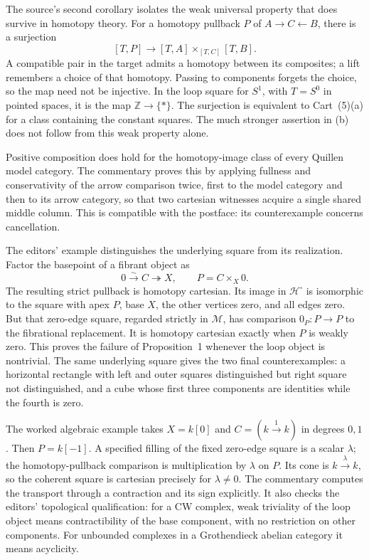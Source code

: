 The source's second corollary isolates the weak universal property that does survive in homotopy theory. For a homotopy pullback $P$ of $A\to C\leftarrow B$, there is a surjection
\[
[T,P]\longrightarrow[T,A]\times_{[T,C]}[T,B].
\]
A compatible pair in the target admits a homotopy between its composites; a lift remembers a choice of that homotopy. Passing to components forgets the choice, so the map need not be injective. In the loop square for $S^1$, with $T=S^0$ in pointed spaces, it is the map $\mathbb Z\to\{*\}$. The surjection is equivalent to Cart~(5)(a) for a class containing the constant squares. The much stronger assertion in (b) does not follow from this weak property alone.

Positive composition does hold for the homotopy-image class of every Quillen model category. The commentary proves this by applying fullness and conservativity of the arrow comparison twice, first to the model category and then to its arrow category, so that two cartesian witnesses acquire a single shared middle column. This is compatible with the postface: its counterexample concerns cancellation.

The editors' example distinguishes the underlying square from its realization. Factor the basepoint of a fibrant object as
\[
0\xrightarrow{\sim}C\twoheadrightarrow X,
\qquad P=C\times_X0.
\]
The resulting strict pullback is homotopy cartesian. Its image in $\mathcal H^{\square}$ is isomorphic to the square with apex $P$, base $X$, the other vertices zero, and all edges zero. But that zero-edge square, regarded strictly in $\mathcal M$, has comparison $0_P:P\to P$ to the fibrational replacement. It is homotopy cartesian exactly when $P$ is weakly zero. This proves the failure of Proposition~1 whenever the loop object is nontrivial. The same underlying square gives the two final counterexamples: a horizontal rectangle with left and outer squares distinguished but right square not distinguished, and a cube whose first three components are identities while the fourth is zero.

The worked algebraic example takes $X=k[0]$ and $C=(k\xrightarrow1k)$ in degrees $0,1$. Then $P=k[-1]$. A specified filling of the fixed zero-edge square is a scalar $\lambda$; the homotopy-pullback comparison is multiplication by $\lambda$ on $P$. Its cone is $k\xrightarrow\lambda k$, so the coherent square is cartesian precisely for $\lambda\ne0$. The commentary computes the transport through a contraction and its sign explicitly. It also checks the editors' topological qualification: for a CW complex, weak triviality of the loop object means contractibility of the base component, with no restriction on other components. For unbounded complexes in a Grothendieck abelian category it means acyclicity.

